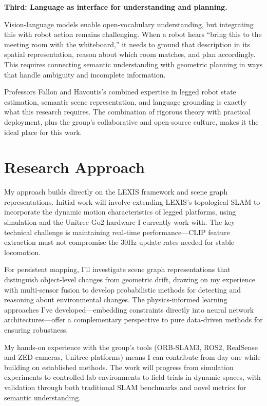 \documentclass[12pt]{article}
\begin{document}
\vspace{0.2cm}
\noindent\textbf{Third: Language as interface for understanding and planning.}

Vision-language models enable open-vocabulary understanding, but integrating this with robot action remains challenging. When a robot hears ``bring this to the meeting room with the whiteboard,'' it needs to ground that description in its spatial representation, reason about which room matches, and plan accordingly. This requires connecting semantic understanding with geometric planning in ways that handle ambiguity and incomplete information.

\vspace{0.2cm}
Professors Fallon and Havoutis's combined expertise in legged robot state estimation, semantic scene representation, and language grounding is exactly what this research requires. The combination of rigorous theory with practical deployment, plus the group's collaborative and open-source culture, makes it the ideal place for this work.


\section*{Research Approach}

My approach builds directly on the LEXIS framework and scene graph representations. Initial work will involve extending LEXIS's topological SLAM to incorporate the dynamic motion characteristics of legged platforms, using simulation and the Unitree Go2 hardware I currently work with. The key technical challenge is maintaining real-time performance—CLIP feature extraction must not compromise the 30Hz update rates needed for stable locomotion.

For persistent mapping, I'll investigate scene graph representations that distinguish object-level changes from geometric drift, drawing on my experience with multi-sensor fusion to develop probabilistic methods for detecting and reasoning about environmental changes. The physics-informed learning approaches I've developed—embedding constraints directly into neural network architectures—offer a complementary perspective to pure data-driven methods for ensuring robustness.

My hands-on experience with the group's tools (ORB-SLAM3, ROS2, RealSense and ZED cameras, Unitree platforms) means I can contribute from day one while building on established methods. The work will progress from simulation experiments to controlled lab environments to field trials in dynamic spaces, with validation through both traditional SLAM benchmarks and novel metrics for semantic understanding.
\end{document}
